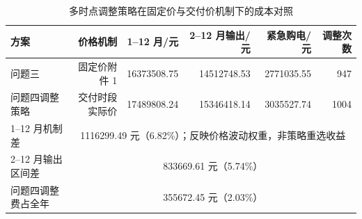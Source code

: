 \begin{table}[htbp]
\centering
\caption{多时点调整策略在固定价与交付价机制下的成本对照}\label{tab:q4-3-mechanism-compare}
\footnotesize\setlength{\tabcolsep}{2.5pt}
\begin{tabular}{@{}lrrrrr@{}}
\toprule
方案 & 价格机制 & 1--12 月/元 & 2--12 月输出/元 & 紧急购电/元 & 调整次数 \\
\midrule
问题三 & 固定价附件 1 & 16373508.75 & 14512748.53 & 2771035.55 & 947 \\
问题四调整策略 & 交付时段实际价 & 17489808.24 & 15346418.14 & 3035527.74 & 1004 \\
\midrule
1--12 月机制差 & \multicolumn{5}{c}{1116299.49 元（6.82\%）；反映价格波动权重，非策略重选收益} \\
2--12 月输出区间差 & \multicolumn{5}{c}{833669.61 元（5.74\%）} \\
问题四调整费占全年 & \multicolumn{5}{c}{355672.45 元（2.03\%）} \\
\bottomrule
\end{tabular}
\end{table}
